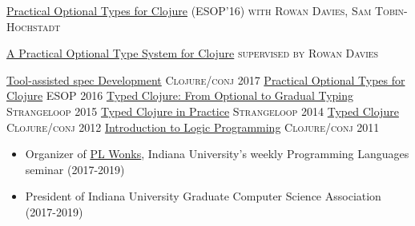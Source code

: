 \documentclass[11pt]{article}
\begin{document}
\headedsection
  {\href{http://frenchy64.github.io/papers/esop16-short.pdf}{Practical Optional Types for Clojure}
  (ESOP'16)}
  {\textsc{with Rowan Davies, Sam Tobin-Hochstadt}} {%
    {}
}


\headedsection
  {\href{https://s3.amazonaws.com/github/downloads/frenchy64/papers/ambrose-honours.pdf}{A Practical Optional Type System for Clojure} }
  {\textsc{supervised by Rowan Davies}} {%
}


%





\headedsection
  {\href{https://www.youtube.com/watch?v=kcZVkvO1Dpo}{Tool-assisted spec Development}}
  {\textsc{Clojure/conj 2017}} {%
}
\headedsection
  {\href{http://ambrosebs.com/talks/esop16.pdf}{Practical Optional Types for Clojure}}
  {\textsc{ESOP 2016}} {%
  }
\headedsection
  {\href{https://www.youtube.com/watch?v=yG9CffLlXx0}{Typed Clojure: From Optional to Gradual Typing}}
  {\textsc{Strangeloop 2015}} {%
}
\headedsection
  {\href{https://www.youtube.com/watch?v=a0gT0syAXsY}{Typed Clojure in Practice}}
  {\textsc{Strangeloop 2014}} {%
}
\headedsection
  {\href{https://www.youtube.com/watch?v=a0gT0syAXsY}{Typed Clojure}}
  {\textsc{Clojure/conj 2012}} {%
}
\headedsection
  {\href{https://www.youtube.com/watch?v=irjP8BO1B8Y}{Introduction to Logic Programming}}
  {\textsc{Clojure/conj 2011}} {%
}

%
%

\bodytext
  {
\begin{itemize}
  \item Organizer of \href{http://wonks.github.io}{PL Wonks}, Indiana University's weekly Programming Languages seminar
    (2017-2019)
  \item President of Indiana University Graduate Computer Science Association
    (2017-2019)
\end{itemize}
    }
\end{document}
